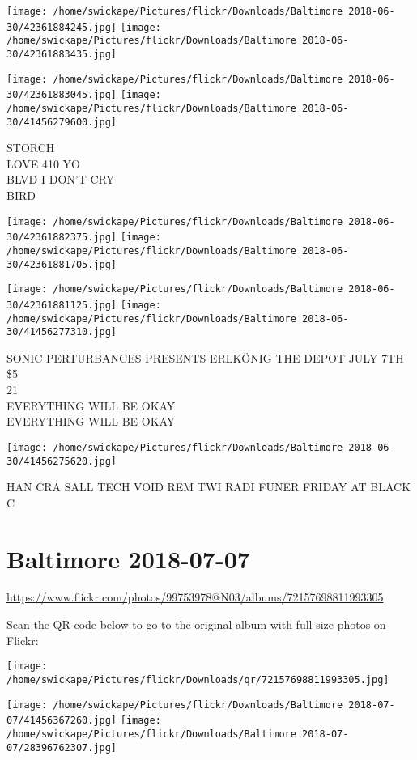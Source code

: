 \documentclass[10pt,letterpaper]{article}
\begin{document}
\texttt{[image: /home/swickape/Pictures/flickr/Downloads/Baltimore 2018-06-30/42361884245.jpg]}
\texttt{[image: /home/swickape/Pictures/flickr/Downloads/Baltimore 2018-06-30/42361883435.jpg]}

\texttt{[image: /home/swickape/Pictures/flickr/Downloads/Baltimore 2018-06-30/42361883045.jpg]}
\texttt{[image: /home/swickape/Pictures/flickr/Downloads/Baltimore 2018-06-30/41456279600.jpg]}

STORCH\\
LOVE 410 YO\\
BLVD I DON'T CRY\\
BIRD
\pagebreak

\texttt{[image: /home/swickape/Pictures/flickr/Downloads/Baltimore 2018-06-30/42361882375.jpg]}
\texttt{[image: /home/swickape/Pictures/flickr/Downloads/Baltimore 2018-06-30/42361881705.jpg]}

\texttt{[image: /home/swickape/Pictures/flickr/Downloads/Baltimore 2018-06-30/42361881125.jpg]}
\texttt{[image: /home/swickape/Pictures/flickr/Downloads/Baltimore 2018-06-30/41456277310.jpg]}

SONIC PERTURBANCES PRESENTS ERLKÖNIG THE DEPOT JULY 7TH \$5\\
21\\
EVERYTHING WILL BE OKAY\\
EVERYTHING WILL BE OKAY
\pagebreak

\texttt{[image: /home/swickape/Pictures/flickr/Downloads/Baltimore 2018-06-30/41456275620.jpg]}

HAN CRA SALL TECH VOID REM TWI RADI FUNER FRIDAY AT BLACK C
\pagebreak

\section*{Baltimore 2018-07-07}

\url{https://www.flickr.com/photos/99753978@N03/albums/72157698811993305}

Scan the QR code below to go to the original album with full-size photos on Flickr:

\texttt{[image: /home/swickape/Pictures/flickr/Downloads/qr/72157698811993305.jpg]}
\pagebreak

\texttt{[image: /home/swickape/Pictures/flickr/Downloads/Baltimore 2018-07-07/41456367260.jpg]}
\texttt{[image: /home/swickape/Pictures/flickr/Downloads/Baltimore 2018-07-07/28396762307.jpg]}
\end{document}

